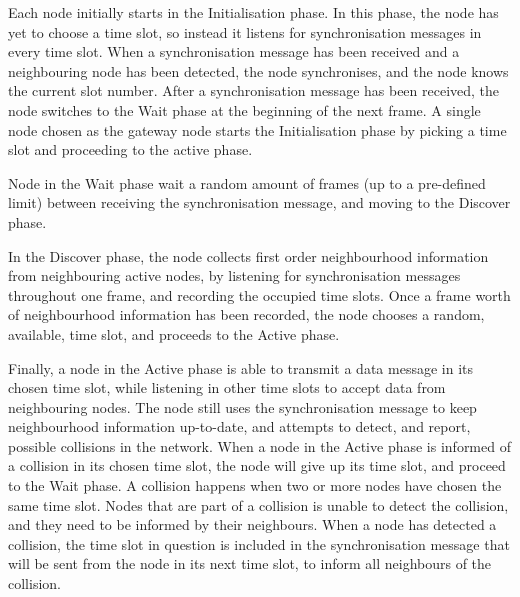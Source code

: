 \begin{description}[style=nextline]
    \item[Initialisation] Each node initially starts in the Initialisation phase. In this phase, the node has
          yet to choose a time slot, so instead it listens for synchronisation messages in every time slot.
          When a synchronisation message has been received and a neighbouring node has been detected, the node
          synchronises, and the node knows the current slot number. After a synchronisation message has been
          received, the node switches to the Wait phase at the beginning of the next frame. A single node
          chosen as the gateway node starts the Initialisation phase by picking a time slot and proceeding to
          the active phase.
    \item[Wait] Node in the Wait phase wait a random amount of frames (up to a pre-defined limit) between
          receiving the synchronisation message, and moving to the Discover phase.
    \item[Discover] In the Discover phase, the node collects first order neighbourhood information from
          neighbouring active nodes, by listening for synchronisation messages throughout one frame, and
          recording the occupied time slots. Once a frame worth of neighbourhood information has been
          recorded, the node chooses a random, available, time slot, and proceeds to the Active phase.
    \item[Active] Finally, a node in the Active phase is able to transmit a data message in its chosen time
          slot, while listening in other time slots to accept data from neighbouring nodes. The node still
          uses the synchronisation message to keep neighbourhood information up-to-date, and attempts to
          detect, and report, possible collisions in the network. When a node in the Active phase is informed
          of a collision in its chosen time slot, the node will give up its time slot, and proceed to the Wait
          phase. A collision happens when two or more nodes have chosen the same time slot. Nodes that are
          part of a collision is unable to detect the collision, and they need to be informed by their
          neighbours. When a node has detected a collision, the time slot in question is included in the
          synchronisation message that will be sent from the node in its next time slot, to inform all
          neighbours of the collision.
\end{description}

